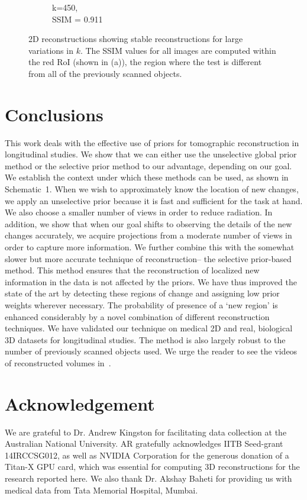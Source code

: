 \documentclass[journal]{IEEEtran}
\begin{document}
\begin{figure}[h]
\begin{subfigure}[b]{0.24\linewidth}
        \caption{k=450,\\ SSIM = 0.911}
     \end{subfigure}
    \caption{2D reconstructions showing stable reconstructions for large variations in $k$. The SSIM values for all images are computed within the red RoI (shown in (a)), the region where the test is different from all of the previously scanned objects.}
\label{fig:reconstructions_as_k_varies}
\end{figure}


\section{Conclusions}
\label{sec:conclusions}
This work deals with the effective use of priors for tomographic reconstruction in longitudinal studies. We show that we can either use the unselective global prior method or the selective prior method to our advantage, depending on our goal. We establish the context under which these methods can be used, as shown in Schematic~1. When we wish to approximately know the location of new changes, we apply an unselective prior because it is fast and sufficient for the task at hand. We also choose a smaller number of views in order to reduce radiation. In addition, we show that when our goal shifts to observing the details of the new changes accurately, we acquire projections from a moderate number of views in order to capture more information. We further combine this with the somewhat slower but more accurate technique of reconstruction-- the selective prior-based method. This method ensures that the reconstruction of localized new information in the data is not affected by the priors. We have thus improved the state of the art by detecting these regions of change and assigning low prior weights wherever necessary. The probability of presence of a `new region' is enhanced considerably by a novel combination of different reconstruction techniques.  We have validated our technique on medical 2D and real, biological 3D datasets for longitudinal studies. The method is also largely robust to the number of previously scanned objects used. We urge the reader to see the videos of reconstructed volumes in~\cite{supp_paper}. 

\section{Acknowledgement}
We are grateful to Dr. Andrew Kingston for facilitating data collection at the  Australian National University. AR gratefully acknowledges IITB Seed-grant 14IRCCSG012, as well as NVIDIA Corporation for the generous donation of a Titan-X GPU card, which was essential for computing 3D reconstructions for the research reported here. We also thank Dr. Akshay Baheti for providing us with medical data from Tata Memorial Hospital, Mumbai. 
{%
}
\end{document}
